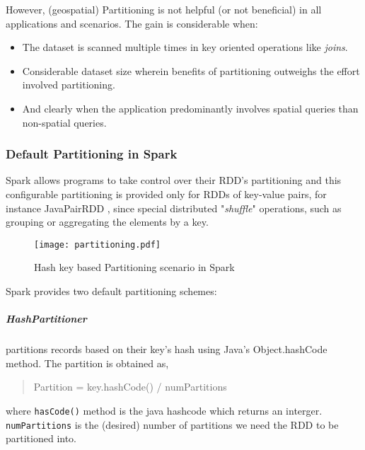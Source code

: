\documentclass[article,type=msc,colorback,12pt,accentcolor=tud1d]{tudthesis}
\begin{document}
			However, (geospatial) Partitioning is not helpful (or not beneficial) in all applications and scenarios. The gain is considerable when: 
			\begin{itemize}
				\item The dataset is scanned multiple times in key oriented operations like \textit{joins}.\cite{sparkbook}
				\item Considerable dataset size wherein benefits of partitioning outweighs the effort involved partitioning.
				\item And clearly when the application predominantly involves spatial queries than non-spatial queries.
			\end{itemize}
			
		\subsubsection{Default Partitioning in Spark}
			\par Spark allows programs to take control over their RDD's partitioning and this configurable partitioning is provided only for RDDs of key-value pairs, for instance JavaPairRDD \cite{sparkapiPairRDD}, since special distributed "\textit{shuffle}" operations, such as grouping or aggregating the elements by a key.\\
			
				\begin{figure}[h]
					\centering
					\texttt{[image: partitioning.pdf]}
					\caption{Hash key based Partitioning scenario in Spark}
					\label{fig:partitioning}
				\end{figure}
				
			
			\par Spark provides two default partitioning schemes:
			\subparagraph{HashPartitioner} partitions records based on their key's hash using Java's Object.hashCode method. The partition is obtained as,
			
			\begin{quote}
				\centering Partition = key.hashCode() / numPartitions
			\end{quote}
			where \texttt{hasCode()} method is the java hashcode which returns an interger.  \texttt{numPartitions} is the (desired) number of partitions we need the RDD to be partitioned into.
			
\end{document}
